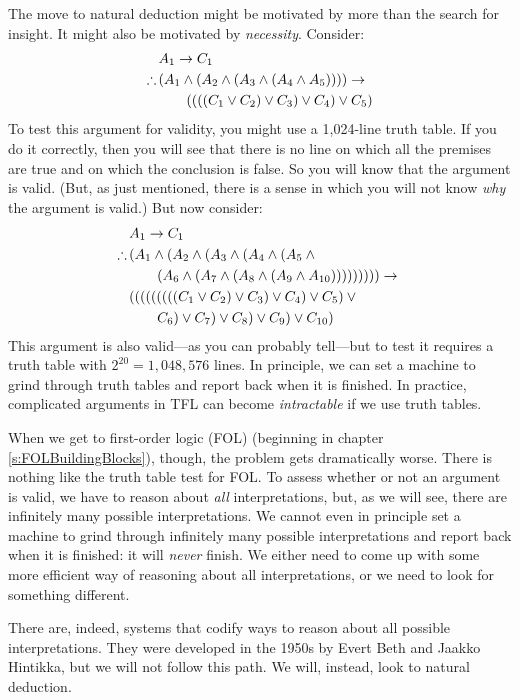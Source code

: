 The move to natural deduction might be motivated by more than the search for insight. It might also be motivated by \emph{necessity}. Consider:
\begin{align*}
	& A_1 \eif C_1 \\
	\therefore\, & (A_1 \eand (A_2 \eand (A_3 \eand (A_4 \eand A_5)))) \eif {}\\ 
	& \qquad ((((C_1 \eor C_2) \eor C_3) \eor C_4) \eor C_5)
\end{align*}
To test this argument for validity, you might use a 1{,}024-line truth table. If you do it correctly, then you will see that there is no line on which all the premises are true and on which the conclusion is false. So you will know that the argument is valid. (But, as just mentioned, there is a sense in which you will not know \emph{why} the argument is valid.) But now consider:
\begin{align*}
& A_1 \eif C_1 \\
\therefore\, & \small (A_1 \eand (A_2 \eand (A_3 \eand (A_4 \eand (A_5 \eand {}\\
&\qquad (A_6 \eand (A_7 \eand (A_8 \eand (A_9 \eand A_{10}))))))))) \eif {}\\
&(((((((((C_1 \eor C_2) \eor C_3) \eor C_4) \eor C_5) \eor {}\\
& \qquad C_6) \eor C_7) \eor C_8) \eor C_9) \eor C_{10})
\end{align*}
This argument is also valid---as you can probably tell---but to test it requires a truth table with $2^{20} = 1{,}048{,}576$ lines. In principle, we can set a machine to grind through truth tables and report back when it is finished. In practice, complicated arguments in TFL can become \emph{intractable} if we use truth tables.

When we get to first-order logic (FOL) (beginning in chapter \ref{s:FOLBuildingBlocks}), though, the problem gets dramatically worse. There is nothing like the truth table test for FOL. To assess whether or not an argument is valid, we have to reason about \emph{all} interpretations, but, as we will see, there are infinitely many possible interpretations. We cannot even in principle set a machine to grind through infinitely many possible interpretations and report back when it is finished: it will \emph{never} finish. We either need to come up with some more efficient way of reasoning about all interpretations, or we need to look for something different.

There are, indeed, systems that codify ways to reason about all possible interpretations. They were developed in the 1950s by Evert Beth and Jaakko Hintikka, but we will not follow this path. We will, instead, look to natural deduction.


